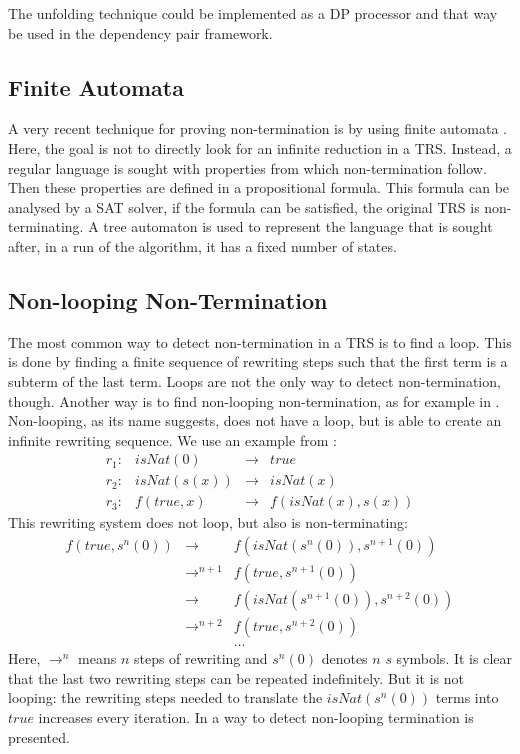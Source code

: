 The unfolding technique could be implemented as a DP processor and that way be used in the dependency pair framework. 
\subsection{Finite Automata}
A very recent technique for proving non-termination is by using finite automata \cite{ENDRULLIS:AUTOMATA}. Here, the goal is not to directly look for an infinite reduction in a TRS. Instead, a regular language is sought with properties from which non-termination follow. Then these properties are defined in a propositional formula. This formula can be analysed by a SAT solver, if the formula can be satisfied, the original TRS is non-terminating. A tree automaton is used to represent the language that is sought after, in a run of the algorithm, it has a fixed number of states. 

\subsection{Non-looping Non-Termination}
The most common way to detect non-termination in a TRS is to find a loop. This is done by finding a finite sequence of rewriting steps such that the first term is a subterm of the last term. Loops are not the only way to detect non-termination, though. Another way is to find non-looping non-termination, as for example in \cite{emmes2012detecting}. Non-looping, as its name suggests, does not have a loop, but is able to create an infinite rewriting sequence. We use an example from \cite{emmes2012detecting}:
\[
\begin{array}{lrcl}
    r_1: & isNat(0) & \rightarrow & true \\
    r_2: & isNat(s(x)) & \rightarrow & isNat(x) \\
    r_3: & f(true, x) & \rightarrow & f(isNat(x), s(x))
\end{array}
\]
This rewriting system does not loop, but also is non-terminating:
\[
\begin{array}{lll}
f(true, s^n(0)) & \rightarrow       & f(isNat(s^n(0)), s^{n+1}(0)) \\
                & \rightarrow^{n+1} & f(true, s^{n+1}(0)) \\
                & \rightarrow       & f(isNat(s^{n+1}(0)), s^{n+2}(0)) \\
                & \rightarrow^{n+2} & f(true, s^{n+2}(0)) \\
                &                   & \dots
\end{array}
\]
Here, $\rightarrow^n$ means $n$ steps of rewriting and $s^{n}(0)$ denotes $n$ $s$ symbols. It is clear that the last two rewriting steps can be repeated indefinitely. But it is not looping: the rewriting steps needed to translate the $isNat(s^{n}(0))$ terms into $true$ increases every iteration. In \cite{emmes2012detecting} a way to detect non-looping termination is presented. 

